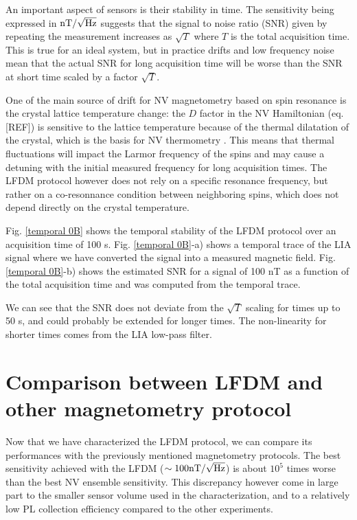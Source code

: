 \documentclass[a4paper, 11pt]{book}
\begin{document}
An important aspect of sensors is their stability in time. The sensitivity being expressed in $\rm{nT} / \sqrt{\rm Hz}$ suggests that the signal to noise ratio (SNR) given by repeating the measurement increases as $\sqrt{T}$ where $T$ is the total acquisition time. This is true for an ideal system, but in practice drifts and low frequency noise mean that the actual SNR for long acquisition time will be worse than the SNR at short time scaled by a factor $\sqrt{T}$.

One of the main source of drift for NV magnetometry based on spin resonance is the crystal lattice temperature change: the $D$ factor in the NV Hamiltonian (eq. [REF]) is sensitive to the lattice temperature because of the thermal dilatation of the crystal, which is the basis for NV thermometry \citep{kucsko2013nanometre}. This means that thermal fluctuations will impact the Larmor frequency of the spins and may cause a detuning with the initial measured frequency for long acquisition times. The LFDM protocol however does not rely on a specific resonance frequency, but rather on a co-resonnance condition between neighboring spins, which does not depend directly on the crystal temperature.

Fig. \ref{temporal 0B} shows the temporal stability of the LFDM protocol over an acquisition time of 100 s. Fig. \ref{temporal 0B}-a) shows a temporal trace of the LIA signal where we have converted the signal into a measured magnetic field. Fig. \ref{temporal 0B}-b) shows the estimated SNR for a signal of 100 nT as a function of the total acquisition time and was computed from the temporal trace.

We can see that the SNR does not deviate from the $\sqrt{T}$ scaling for times up to 50 s, and could probably be extended for longer times. The non-linearity for shorter times comes from the LIA low-pass filter.

\section{Comparison between LFDM and other magnetometry protocol}
\label{sec 4.6}
Now that we have characterized the LFDM protocol, we can compare its performances with the previously mentioned magnetometry protocols. The best sensitivity achieved with the LFDM ($\sim 100 \rm{nT} / \sqrt{\rm Hz}$) is about $10^5$ times worse than the best NV ensemble sensitivity. This discrepancy however come in large part to the smaller sensor volume used in the characterization, and to a relatively low PL collection efficiency compared to the other experiments.
\end{document}
